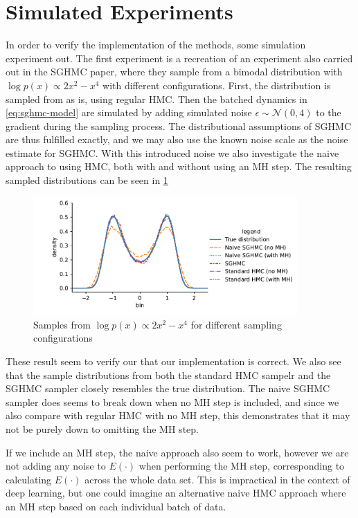 \section{Simulated Experiments}

In order to verify the implementation of the methods, some simulation experiment out. 
The first experiment is a recreation of an experiment also carried out in the SGHMC paper, where they sample from a bimodal distribution with $\log p(x) \propto 2 x^2 - x^ 4$ with different configurations. 
First, the distribution is sampled from as is, using regular HMC.
Then the batched dynamics in \cref{eq:sghmc-model} are simulated by adding simulated noise $\epsilon \sim \mathcal{N}(0, 4)$ to the gradient during the sampling process. 
The distributional assumptions of SGHMC are thus fulfilled exactly, and we may also use the known noise scale as the noise estimate for SGHMC. 
With this introduced noise we also investigate the naive approach to using HMC, both with and without using an MH step. 
The resulting sampled distributions can be seen in \cref{fig:synthetic}
\begin{figure}[htb]
    \centering
    \includegraphics[width=0.9\textwidth]{Figures/synthetic.pdf}
    \caption{Samples from $\log p(x) \propto 2 x^2 - x^ 4$ for different sampling configurations}
    \label{fig:synthetic}
\end{figure}
These result seem to verify our that our implementation is correct.
We also see that the sample distributions from both the standard HMC sampelr and the SGHMC sampler closely resembles the true distribution. 
The naive SGHMC sampler does seems to break down when no MH step is included, and since we also compare with regular HMC with no MH step, this demonstrates that it may not be purely down to omitting the MH step. 

If we include an MH step, the naive approach also seem to work, however we are not adding any noise to $E(\cdot)$ when performing the MH step, corresponding to calculating $E(\cdot)$ across the whole data set. 
This is impractical in the context of deep learning, but one could imagine an alternative naive HMC approach where an MH step based on each individual batch of data. 

